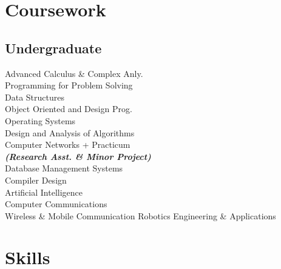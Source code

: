 \documentclass[]{resume-openfont}
\begin{document}
\begin{minipage}[t]{0.33\textwidth}

\section{Coursework}

\subsection{Undergraduate}
Advanced Calculus \& Complex Anly.\\
Programming for Problem Solving \\
Data Structures \\
Object Oriented and Design Prog. \\
Operating Systems \\
Design and Analysis of Algorithms \\
Computer Networks + Practicum\\
{\footnotesize \textit{\textbf{(Research Asst. \& Minor Project) }}}\\
Database Management Systems\\
Compiler Design\\
Artificial Intelligence \\
Computer Communications\\
Wireless \& Mobile Communication
Robotics Engineering \& Applications



\section{Skills}

\end{minipage}
\end{document}
